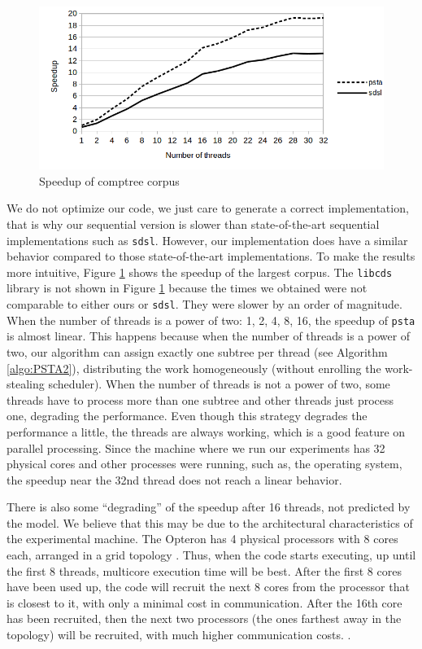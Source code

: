 \begin{figure}[ht]
  \centering
  \includegraphics[scale=0.3]{./images/Speedup.png}
  \caption{Speedup of comptree corpus}
  \label{fig:speedup} 
\end{figure}

We do not optimize our code, we just care to generate a correct
implementation, that is why our sequential version is slower than
state-of-the-art sequential implementations such as
\verb+sdsl+. However, our implementation does have a similar behavior
compared to those state-of-the-art implementations. To make the
results more intuitive, Figure \ref{fig:speedup} shows the speedup of
the largest corpus. The \verb+libcds+ library is not shown in Figure
\ref{fig:speedup} because the times we obtained were not comparable to
either ours or \verb+sdsl+. They were slower by an order of
magnitude. When the number of threads is a power of two: 1, 2, 4, 8,
16, the speedup of \verb+psta+ is almost linear. This happens because
when the number of threads is a power of two, our algorithm can assign
exactly one subtree per thread (see Algorithm \ref{algo:PSTA2}),
distributing the work homogeneously (without enrolling the
work-stealing scheduler). When the number of threads is not a power of
two, some threads have to process more than one subtree and other
threads just process one, degrading the performance. Even though this
strategy degrades the performance a little, the threads are always
working, which is a good feature on parallel processing. Since the
machine where we run our experiments has 32 physical cores and other
processes were running, such as, the operating system, the speedup
near the 32nd thread does not reach a linear behavior. 

There is also some ``degrading'' of the speedup after 16 threads, not
predicted by the model. We believe that this may be due to the
architectural characteristics of the experimental machine. The Opteron
has 4 physical processors with 8 cores each, arranged in a grid
topology . Thus, when the code starts executing, up until
the first 8 threads, multicore execution time will be best. After the
first 8 cores have been used up, the code will recruit the next 8
cores from the processor that is closest to it, with only a minimal
cost in communication. After the 16th core has been recruited, then
the next two processors (the ones farthest away in the topology) will
be recruited, with much higher communication costs. .

